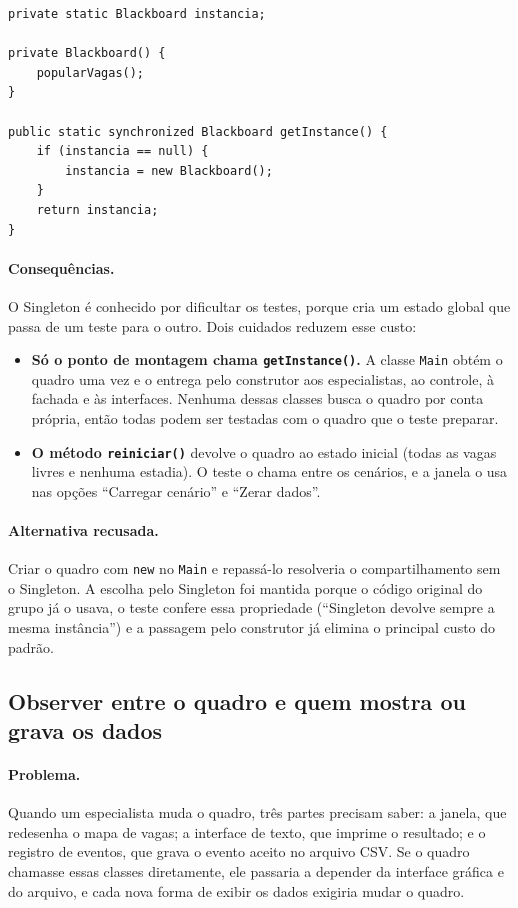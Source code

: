 \begin{lstlisting}[caption={O ponto de acesso do Singleton (\texttt{Blackboard.java}).},label=cod:singleton]
private static Blackboard instancia;

private Blackboard() {
    popularVagas();
}

public static synchronized Blackboard getInstance() {
    if (instancia == null) {
        instancia = new Blackboard();
    }
    return instancia;
}
\end{lstlisting}

\paragraph{Consequências.} O Singleton é conhecido por dificultar os testes, porque cria um estado global que passa de um teste para o outro. Dois cuidados reduzem esse custo:

\begin{itemize}
  \item \textbf{Só o ponto de montagem chama \texttt{getInstance()}.} A classe \texttt{Main} obtém o quadro uma vez e o entrega pelo construtor aos especialistas, ao controle, à fachada e às interfaces. Nenhuma dessas classes busca o quadro por conta própria, então todas podem ser testadas com o quadro que o teste preparar.
  \item \textbf{O método \texttt{reiniciar()}} devolve o quadro ao estado inicial (todas as vagas livres e nenhuma estadia). O teste o chama entre os cenários, e a janela o usa nas opções ``Carregar cenário'' e ``Zerar dados''.
\end{itemize}

\paragraph{Alternativa recusada.} Criar o quadro com \texttt{new} no \texttt{Main} e repassá-lo resolveria o compartilhamento sem o Singleton. A escolha pelo Singleton foi mantida porque o código original do grupo já o usava, o teste confere essa propriedade (``Singleton devolve sempre a mesma instância'') e a passagem pelo construtor já elimina o principal custo do padrão.

\subsection{Observer entre o quadro e quem mostra ou grava os dados}

\paragraph{Problema.} Quando um especialista muda o quadro, três partes precisam saber: a janela, que redesenha o mapa de vagas; a interface de texto, que imprime o resultado; e o registro de eventos, que grava o evento aceito no arquivo CSV. Se o quadro chamasse essas classes diretamente, ele passaria a depender da interface gráfica e do arquivo, e cada nova forma de exibir os dados exigiria mudar o quadro.

